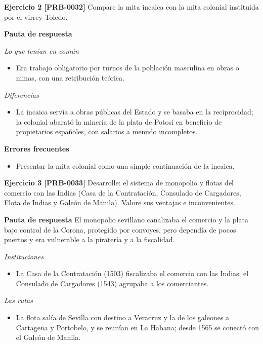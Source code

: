 \documentclass{book}
\begin{document}
\noindent\textbf{Ejercicio 2 [PRB-0032]}
Compare la mita incaica con la mita colonial instituida por el virrey Toledo.


\noindent\textbf{Pauta de respuesta}

\noindent\textit{Lo que tenían en común}
\begin{itemize}
\item Era trabajo obligatorio por turnos de la población masculina en obras o minas, con una retribución teórica.
\end{itemize}

\noindent\textit{Diferencias}
\begin{itemize}
\item La incaica servía a obras públicas del Estado y se basaba en la reciprocidad; la colonial abarató la minería de la plata de Potosí en beneficio de propietarios españoles, con salarios a menudo incompletos.
\end{itemize}

\noindent\textbf{Errores frecuentes}
\begin{itemize}
\item Presentar la mita colonial como una simple continuación de la incaica.
\end{itemize}

\noindent\textbf{Ejercicio 3 [PRB-0033]}
Desarrolle: el sistema de monopolio y flotas del comercio con las Indias (Casa de la Contratación, Consulado de Cargadores, Flota de Indias y Galeón de Manila). Valore sus ventajas e inconvenientes.


\noindent\textbf{Pauta de respuesta}
El monopolio sevillano canalizaba el comercio y la plata bajo control de la Corona, protegido por convoyes, pero dependía de pocos puertos y era vulnerable a la piratería y a la fiscalidad.


\noindent\textit{Instituciones}
\begin{itemize}
\item La Casa de la Contratación (1503) fiscalizaba el comercio con las Indias; el Consulado de Cargadores (1543) agrupaba a los comerciantes.
\end{itemize}

\noindent\textit{Las rutas}
\begin{itemize}
\item La flota salía de Sevilla con destino a Veracruz y la de los galeones a Cartagena y Portobelo, y se reunían en La Habana; desde 1565 se conectó con el Galeón de Manila.
\end{itemize}
\end{document}
